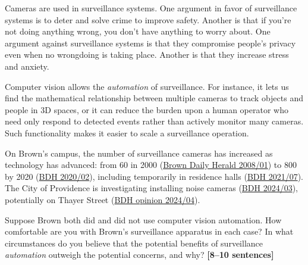 \documentclass{csci1430}
\begin{document}
\pagebreak 
\begin{question}[points=4,drawbox=false]
Cameras are used in surveillance systems. One argument in favor of surveillance systems is to deter and solve crime to improve safety. Another is that if you're not doing anything wrong, you don't have anything to worry about. One argument against surveillance systems is that they compromise people's privacy even when no wrongdoing is taking place. Another is that they increase stress and anxiety.

Computer vision allows the \emph{automation} of surveillance. For instance, it lets us find the mathematical relationship between multiple cameras to track objects and people in 3D spaces, or it can reduce the burden upon a human operator who need only respond to detected events rather than actively monitor many cameras. Such functionality makes it easier to scale a surveillance operation.

On Brown's campus, the number of surveillance cameras has increased as technology has advanced: from 60 in 2000 (\href{https://www.browndailyherald.com/2008/01/10/surveillance-cameras-on-campus-triple/}{Brown Daily Herald 2008/01}) to 800 by 2020 (\href{https://www.browndailyherald.com/2020/02/21/cameras-installed-hegeman-hall/}{BDH 2020/02}), including temporarily in residence halls (\href{https://www.browndailyherald.com/article/2021/07/university-removes-hegeman-hall-surveillance-cameras}{BDH 2021/07}). The City of Providence is investigating installing noise cameras (\href{https://www.browndailyherald.com/article/2024/03/mayor-smiley-pushes-for-noise-camera-installation-in-providence}{BDH 2024/03}), potentially on Thayer Street (\href{https://www.browndailyherald.com/article/2024/04/chang-27-how-mayor-smileys-noise-cameras-can-tame-thayer-and-save-our-ears}{BDH opinion 2024/04}).
\end{question}



\begin{orangebox}
Suppose Brown both did and did not use computer vision automation. How comfortable are you with Brown's surveillance apparatus in each case?
In what circumstances do you believe that the potential benefits of surveillance \emph{automation} outweigh the potential concerns, and why? \textbf{[8--10 sentences]}
\end{orangebox}

\begin{answer}[height=20]
\end{answer}
\end{document}
